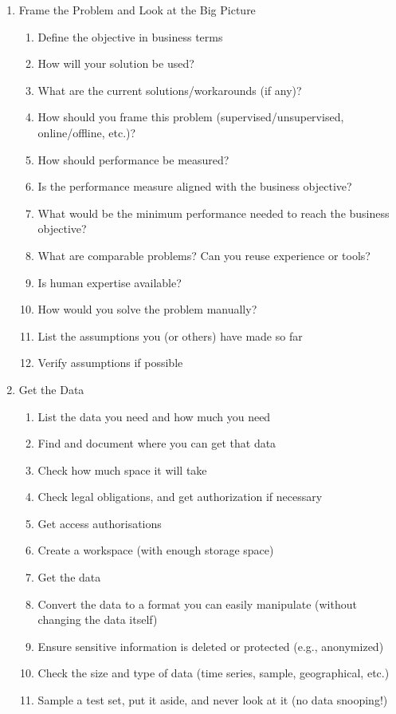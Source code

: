 \documentclass[11pt]{article}
\begin{document}
\begin{enumerate}
\item Frame the Problem and Look at the Big Picture
\begin{enumerate}
\item Define the objective in business terms
\item How will your solution be used?
\item What are the current solutions/workarounds (if any)?
\item How should you frame this problem (supervised/unsupervised, online/offline, etc.)?
\item How should performance be measured?
\item Is the performance measure aligned with the business objective?
\item What would be the minimum performance needed to reach the business objective?
\item What are comparable problems? Can you reuse experience or tools?
\item Is human expertise available?
\item How would you solve the problem manually?
\item List the assumptions you (or others) have made so far
\item Verify assumptions if possible
\end{enumerate}
\item Get the Data
\begin{enumerate}
\item List the data you need and how much you need
\item Find and document where you can get that data
\item Check how much space it will take
\item Check legal obligations, and get authorization if necessary
\item Get access authorisations
\item Create a workspace (with enough storage space)
\item Get the data
\item Convert the data to a format you can easily manipulate (without changing the data itself)
\item Ensure sensitive information is deleted or protected (e.g., anonymized)
\item Check the size and type of data (time series, sample, geographical, etc.)
\item Sample a test set, put it aside, and never look at it (no data snooping!)

\end{enumerate}
\end{enumerate}
\end{document}
